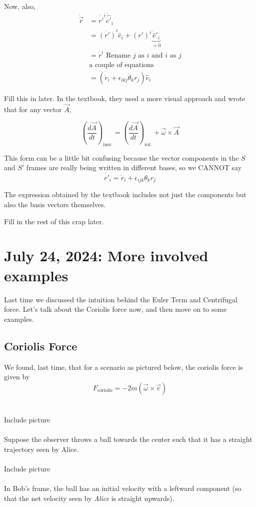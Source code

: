 \documentclass[11pt]{article}
\begin{document}
\vskip 0.5cm
Now, also, 
\begin{align*}
  \dot{\vec{r}} &= \dot{r'}^i \dot{\hat{e'}}_i \\
  &= \dot{(r')}^i \hat{e}_i + (r')^i \underbrace{\dot{\hat{e}}'_i}_{=0} \\
  &= \dot{r}^i  \text{ Rename $j$ as $i$ and $i$ as $j$}\\ 
  &\text{a couple of equations} \\
  &= \left( \dot{r}_i + \epsilon_{ikj} \dot{\theta}_k r_j\right)
 \hat{e}_i\end{align*}

Fill this in later.
\vskip 0.5cm
In the textbook, they used a more visual approach and wrote that for any vector $\vec{A}$,

\[ \left(\frac{d\vec{A}}{dt}\right)_{\text{iner.}} = \left(\frac{d\vec{A}}{dt}\right)_{\text{rot.}} + \vec{\omega} \times \vec{A}  \]

\vskip 0.5cm
This form can be a little bit confusing because the vector components in the $S$ and $S'$ frames are really being written in different bases, so we CANNOT say 
\[ \dot{r'}_i = \dot{r}_i + \epsilon_{ijk} \dot{\theta}_k r_j \]

\vskip 0.5cm
The expression obtained by the textbook includes not just the components but also the basis vectors themselves.

\vskip 0.5cm
Fill in the rest of this crap later. 

\pagebreak
\section{July 24, 2024: More involved examples}

Last time we discussed the intuition behind the Euler Term and Centrifugal force. Let's talk about the Coriolis force now, and then move on to some examples.
\\
\subsection{Coriolis Force}
We found, last time, that for a scenario as pictured below, the coriolis force is given by
\[F_{\text{coriolis}} = -2m\left(\vec{\omega} \times \vec{v}\right) \]
\\
\\
Include picture
\\
\\
Suppose the observer throws a ball towards the center such that it has a straight trajectory seen by Alice. 
\\
\\
Include picture
\\
\\
In Bob's frame, the ball has an initial velocity with a leftward component (so that the net velocity seen by \emph{Alice} is straight upwards).
\end{document}
